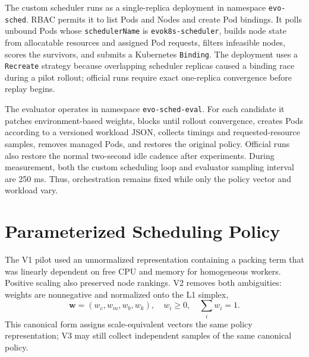 \documentclass[conference]{IEEEtran}
\begin{document}
The custom scheduler runs as a single-replica deployment in namespace \texttt{evo-sched}. RBAC permits it to list Pods and Nodes and create Pod bindings. It polls unbound Pods whose \texttt{schedulerName} is \texttt{evok8s-scheduler}, builds node state from allocatable resources and assigned Pod requests, filters infeasible nodes, scores the survivors, and submits a Kubernetes \texttt{Binding}. The deployment uses a \texttt{Recreate} strategy because overlapping scheduler replicas caused a binding race during a pilot rollout; official runs require exact one-replica convergence before replay begins.

The evaluator operates in namespace \texttt{evo-sched-eval}. For each candidate it patches environment-based weights, blocks until rollout convergence, creates Pods according to a versioned workload JSON, collects timings and requested-resource samples, removes managed Pods, and restores the original policy. Official runs also restore the normal two-second idle cadence after experiments. During measurement, both the custom scheduling loop and evaluator sampling interval are 250 ms. Thus, orchestration remains fixed while only the policy vector and workload vary.

\section{Parameterized Scheduling Policy}
The V1 pilot used an unnormalized representation containing a packing term that was linearly dependent on free CPU and memory for homogeneous workers. Positive scaling also preserved node rankings. V2 removes both ambiguities: weights are nonnegative and normalized onto the L1 simplex,
\begin{equation}
\mathbf{w}=(w_c,w_m,w_b,w_k),\quad w_i\geq0,\quad\sum_i w_i=1.
\end{equation}
This canonical form assigns scale-equivalent vectors the same policy representation; V3 may still collect independent samples of the same canonical policy.
\end{document}
